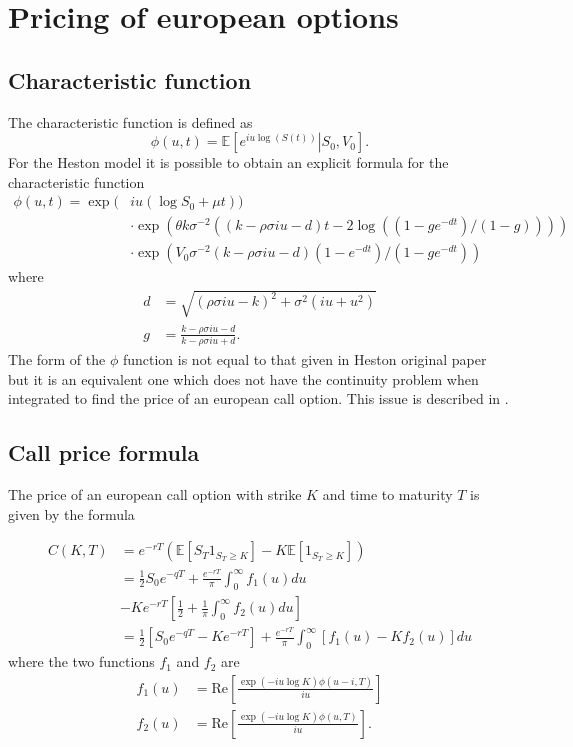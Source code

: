 \section{Pricing of european options}

\subsection{Characteristic function }

The characteristic function is defined as
\begin{equation}
\phi(u,t) = \mathbb{E} \left[\left.e^{iu\log(S(t))}\right|S_0,V_0\right].
\end{equation}
For the Heston model it is possible to obtain an explicit formula for the characteristic function
\begin{align}
\phi(u,t) = \exp( & iu(\log S_0 + \mu t)) \nonumber\\
 & \cdot\exp(\theta k \sigma^{-2}((k-\rho\sigma iu - d)t - 2\log( (1-ge^{-dt})/ (1-g) )))\nonumber\\
 & \cdot\exp(V_0\sigma^{-2}(k-\rho\sigma iu - d)(1-e^{-dt})/(1-ge^{-dt}))
\end{align}
where
\begin{align}
 d & = \sqrt{(\rho\sigma iu - k)^2 + \sigma^2(iu + u^2)} \\
 g & = \frac{k-\rho\sigma iu - d}{k-\rho\sigma iu + d}.
\end{align}
The form of the $\phi$ function is not equal to that given in Heston original paper but it is an equivalent one which does not have the continuity problem when integrated to find the price of an european call option. This issue is described in \cite{Albrecher:HestonTrap}.




\subsection{Call price formula}
\label{call}

The price of an european call option with strike $K$ and time to maturity $T$ is given by the formula

\begin{equation}
\begin{aligned}
C(K,T) &= e^{-r T}\left(	\mathbb{E}\left[S_T 1_{S_T \geq K} \right] - K \mathbb{E}\left[1_{S_T \geq K} \right]\right) \\
&=\frac{1}{2}S_0e^{-q T}+ \frac{e^{-r T}}{\pi}\int_0^{\infty}f_1(u) du  \\
&- K e^{-r T}  \left[ \frac{1}{2} + \frac{1}{\pi}\int_0^{\infty}f_2(u) du \right] \\
&=  \frac{1}{2}\left[S_0e^{-q T} - Ke^{-r T}\right] + \frac{e^{-r T}}{\pi}\int_0^{\infty}\left[f_1(u) - Kf_2(u)\right]du
\end{aligned}
\end{equation}
where the two functions $f_1$ and $f_2$ are
\begin{align}
f_1(u) & = \mathrm{Re}\left[\frac{\exp(-iu\log K)\phi(u-i,T)}{iu}\right]\\
f_2(u) & = \mathrm{Re}\left[\frac{\exp(-iu\log K)\phi(u,T)}{iu}\right].
\end{align}

